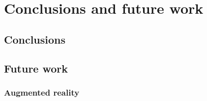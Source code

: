 \chapter{Conclusions and future work}
\label{ch:ConclusionsAndFutureWork}

\section{Conclusions}
\label{sec:Conclusions}

\section{Future work}
\label{sec:FutureWork}

\subsection{Augmented reality}
\label{AugmentedReality}

\endinput
